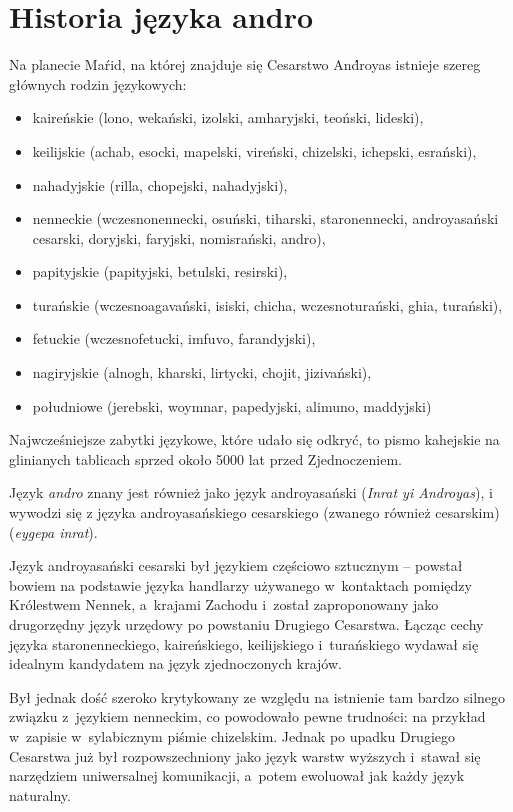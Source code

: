 \section[Historia]{Historia języka andro}

\begin{spacing}{1.1}
Na planecie Maŕid, na której znajduje się Cesarstwo And́royas istnieje szereg
głównych rodzin językowych:

\begin{itemize}
    \item kaireńskie (lono, wekański, izolski, amharyjski, teoński, lideski),
    \item keilijskie (achab, esocki, mapelski, vireński, chizelski, ichepski,
    esrański),
    \item nahadyjskie (rilla, chopejski, nahadyjski),
    \item nenneckie (wczesnonennecki, osuński, tiharski, staronennecki,
    androyasański cesarski, doryjski, faryjski, nomisrański, andro),
    \item papityjskie (papityjski, betulski, resirski),
    \item turańskie (wczesnoagavański, isiski, chicha, wczesnoturański, ghia,
    turański),
    \item fetuckie (wczesnofetucki, imfuvo, farandyjski),
    \item nagiryjskie (alnogh, kharski, lirtycki, chojit, jizivański),
    \item południowe (jerebski, woymnar, papedyjski, alimuno, maddyjski)
\end{itemize}

Najwcześniejsze zabytki językowe, które udało się odkryć, to pismo kahejskie na 
glinianych tablicach sprzed około 5000 lat przed Zjednoczeniem.

Język \emph{andro} znany jest również jako język androyasański (\emph{Inrat yi
Androyas}), i wywodzi się z języka androyasańskiego cesarskiego (zwanego również
cesarskim) (\emph{eygepa inrat}).

Język androyasański cesarski był językiem częściowo sztucznym -- powstał
bowiem na podstawie języka handlarzy używanego w~kontaktach pomiędzy Królestwem
Nennek, a~krajami Zachodu i~został zaproponowany jako drugorzędny język urzędowy
po powstaniu Drugiego Cesarstwa. Łącząc cechy języka staronenneckiego,
kaireńskiego, keilijskiego i~turańskiego wydawał się idealnym kandydatem na
język zjednoczonych krajów.

Był jednak dość szeroko krytykowany ze względu na istnienie tam bardzo silnego
związku z~językiem nenneckim, co powodowało pewne trudności: na przykład
w~zapisie w~sylabicznym piśmie chizelskim. Jednak po upadku Drugiego Cesarstwa
już był rozpowszechniony jako język warstw wyższych i~stawał się narzędziem
uniwersalnej komunikacji, a~potem ewoluował jak każdy język naturalny.


\end{spacing}
